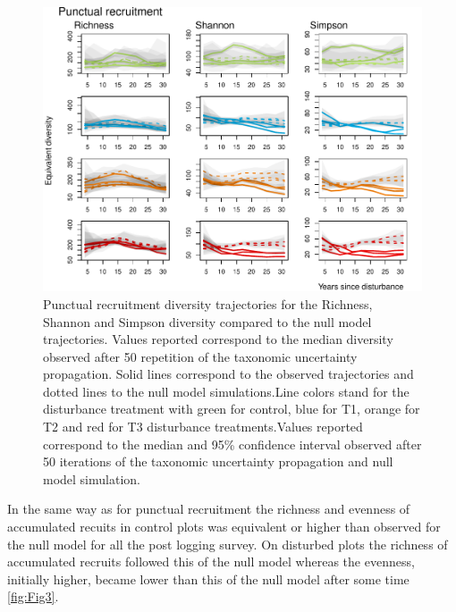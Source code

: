 \documentclass[fleqn,10pt]{ArtEcoFoG} %
\begin{document}
\begin{figure}

{\centering \includegraphics[width=0.8\linewidth]{RecruitmentTrajectories_files/figure-latex/Fig2-1} 

}

\caption{Punctual recruitment diversity trajectories for the Richness, Shannon and Simpson diversity compared to the null model trajectories. Values reported correspond to the median diversity observed after 50 repetition of the taxonomic uncertainty propagation. Solid lines correspond to the observed trajectories and dotted lines to the null model simulations.Line colors stand for the disturbance treatment with green for control, blue for T1, orange for T2 and red for T3 disturbance treatments.Values reported correspond to the median and 95\% confidence interval observed after 50 iterations of the taxonomic uncertainty propagation and null model simulation.}\label{fig:Fig2}
\end{figure}

In the same way as for punctual recruitment the richness and evenness of
accumulated recuits in control plots was equivalent or higher than
observed for the null model for all the post logging survey. On
disturbed plots the richness of accumulated recruits followed this of
the null model whereas the evenness, initially higher, became lower than
this of the null model after some time \ref{fig:Fig3}.
\end{document}
